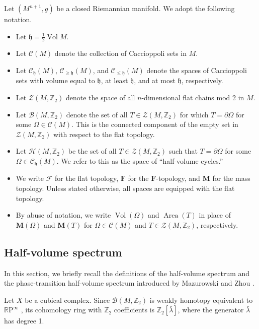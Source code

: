 \documentclass[12pt,english]{article}
\theoremstyle{definition}
\begin{document}
Let $(M^{n+1},g)$ be a closed Riemannian manifold. We adopt the following notation.
\begin{itemize}
\item Let $\mathfrak h = \frac{1}{2}\operatorname{Vol} M$.
\item Let $\mathcal C(M)$ denote the collection of Caccioppoli sets in $M$.
\item Let $\mathcal C_{\mathfrak h}(M)$, $\mathcal C_{\ge \mathfrak h}(M)$, and $\mathcal C_{\le \mathfrak h}(M)$ denote the spaces of Caccioppoli sets with volume equal to $\mathfrak h$, at least $\mathfrak h$, and at most $\mathfrak h$, respectively.
\item Let $\mathcal Z(M,\mathbb{Z}_2)$ denote the space of all $n$-dimensional flat chains mod 2 in $M$.
\item Let $\mathcal B(M,\mathbb{Z}_2)$ denote the set of all $T\in \mathcal Z(M,\mathbb{Z}_2)$ for which $T = \partial \Omega$ for some $\Omega\in \mathcal C(M)$. This is the connected component of the empty set in $\mathcal Z(M,\mathbb{Z}_2)$ with respect to the flat topology.
\item Let $\mathcal H(M,\mathbb{Z}_2)$ be the set of all $T \in \mathcal Z(M,\mathbb{Z}_2)$ such that $T = \partial \Omega$ for some $\Omega\in \mathcal{C}_{\mathfrak h}(M)$. We refer to this as the space of ``half-volume cycles.''
\item We write $\mathcal F$ for the flat topology, $\mathbf F$ for the $\mathbf F$-topology, and $\mathbf M$ for the mass topology. Unless stated otherwise, all spaces are equipped with the flat topology.
\item By abuse of notation, we write $\operatorname{Vol}(\Omega)$ and $\operatorname{Area}(T)$ in place of $\mathbf M(\Omega)$ and $\mathbf M(T)$ for $\Omega\in \mathcal C(M)$ and $T\in \mathcal Z(M,\mathbb{Z}_2)$, respectively.
\end{itemize}

\subsection{Half-volume spectrum}
\label{subsec:half-volume}

In this section, we briefly recall the definitions of the half-volume spectrum and the phase-transition half-volume spectrum introduced by Mazurowski and Zhou \cite{ZhouMazur0}.

Let $X$ be a cubical complex. Since $\mathcal B(M,\mathbb{Z}_2)$ is weakly homotopy equivalent to $\mathbb{R}\text{P}^\infty$ \cite{MN2}, its cohomology ring with $\mathbb{Z}_2$ coefficients is $\mathbb{Z}_2[\bar\lambda]$, where the generator $\bar\lambda$ has degree 1.
\end{document}
